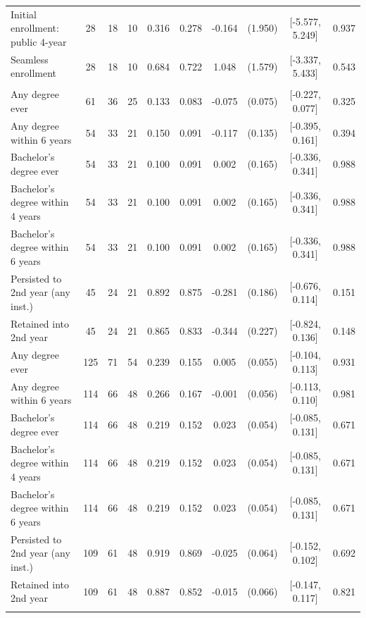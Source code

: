 \begin{table}[t]
\begin{tabular*}{\linewidth}{@{\extracolsep{\fill}}l|ccccccccc}
Initial enrollment: public 4-year & 28 & 18 & 10 & 0.316 & 0.278 & -0.164 & (1.950) & [-5.577, 5.249] & 0.937 \\ 
Seamless enrollment & 28 & 18 & 10 & 0.684 & 0.722 & 1.048 & (1.579) & [-3.337, 5.433] & 0.543 \\ 
\midrule\addlinespace[2.5pt]
\multicolumn{10}{l}{{\itshape \textbf{Panel C: Degree and Persistence Outcomes} \emph{(non-censored subsample)}}} \\[2.5pt] 
\midrule\addlinespace[2.5pt]
Any degree ever & 61 & 36 & 25 & 0.133 & 0.083 & -0.075 & (0.075) & [-0.227, 0.077] & 0.325 \\ 
Any degree within 6 years & 54 & 33 & 21 & 0.150 & 0.091 & -0.117 & (0.135) & [-0.395, 0.161] & 0.394 \\ 
Bachelor's degree ever & 54 & 33 & 21 & 0.100 & 0.091 & 0.002 & (0.165) & [-0.336, 0.341] & 0.988 \\ 
Bachelor's degree within 4 years & 54 & 33 & 21 & 0.100 & 0.091 & 0.002 & (0.165) & [-0.336, 0.341] & 0.988 \\ 
Bachelor's degree within 6 years & 54 & 33 & 21 & 0.100 & 0.091 & 0.002 & (0.165) & [-0.336, 0.341] & 0.988 \\ 
Persisted to 2nd year (any inst.) & 45 & 24 & 21 & 0.892 & 0.875 & -0.281 & (0.186) & [-0.676, 0.114] & 0.151 \\ 
Retained into 2nd year & 45 & 24 & 21 & 0.865 & 0.833 & -0.344 & (0.227) & [-0.824, 0.136] & 0.148 \\ 
Any degree ever & 125 & 71 & 54 & 0.239 & 0.155 & 0.005 & (0.055) & [-0.104, 0.113] & 0.931 \\ 
Any degree within 6 years & 114 & 66 & 48 & 0.266 & 0.167 & -0.001 & (0.056) & [-0.113, 0.110] & 0.981 \\ 
Bachelor's degree ever & 114 & 66 & 48 & 0.219 & 0.152 & 0.023 & (0.054) & [-0.085, 0.131] & 0.671 \\ 
Bachelor's degree within 4 years & 114 & 66 & 48 & 0.219 & 0.152 & 0.023 & (0.054) & [-0.085, 0.131] & 0.671 \\ 
Bachelor's degree within 6 years & 114 & 66 & 48 & 0.219 & 0.152 & 0.023 & (0.054) & [-0.085, 0.131] & 0.671 \\ 
Persisted to 2nd year (any inst.) & 109 & 61 & 48 & 0.919 & 0.869 & -0.025 & (0.064) & [-0.152, 0.102] & 0.692 \\ 
Retained into 2nd year & 109 & 61 & 48 & 0.887 & 0.852 & -0.015 & (0.066) & [-0.147, 0.117] & 0.821 \\ 
\midrule\addlinespace[2.5pt]

\end{tabular*}
\end{table}
